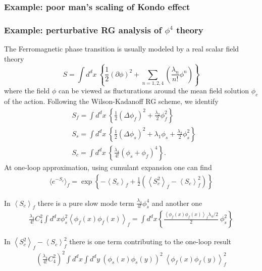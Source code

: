 \documentclass[submission, PhysLectNotes]{SciPost}
\newcommand{\ExOp}[1]{\left\langle#1\right\rangle}
\begin{document}
\subsubsection*{Example: poor man's scaling of Kondo effect}
\subsubsection*{Example: perturbative RG analysis of $\phi^4$ theory}
The Ferromagnetic phase transition is usually modeled by a real scalar field theory
\begin{equation}
S = \int d^d x \ \left\{\frac{1}{2}{\left(\partial\phi\right)}^2 + \sum_{n=1,2,4}\left(\frac{\lambda_n}{n!}\phi^n\right) \right\}
\end{equation}
where the field $\phi$ can be viewed as flucturations around the mean field solution $\phi_c$ of the action. Following the Wilson-Kadanoff RG scheme, we identify
\begin{equation}
\begin{aligned}
&S_f = \int d^d x \ \left\{\frac{1}{2}{\left(\Delta\phi_f\right)}^2 + \frac{\lambda_2}{2}\phi_f^2 \right\} \\
&S_s = \int d^d x \ \left\{\frac{1}{2}{\left(\Delta\phi_s\right)}^2 + \lambda_1 \phi_s + \frac{\lambda_2}{2}\phi_s^2 \right\} \\
&S_c = \int d^d x \ \left\{ \frac{\lambda_4}{4!}{\left(\phi_s + \phi_f\right)}^4 \right\}.
\end{aligned}
\end{equation}
At one-loop approximation, using cumulant expansion one can find
\begin{equation}
\begin{aligned}
\langle e^{-S_c} \rangle_f = \exp\left\{{-\ExOp{S_c}_f + \frac{1}{2}\left( \ExOp{S_c^2}_f - \ExOp{S_c}_f^2\right)}\right\}
\end{aligned}
\end{equation}%

\noindent In $\ExOp{S_c}_f$ there is a pure slow mode term $\frac{\lambda_4}{4!}\phi_s^4$ and another one
\begin{equation}
\begin{aligned}
\frac{\lambda_4}{4!} C^2_4 \int d^d x  \phi_s^2 \ExOp{\phi_f(x)\phi_f(x)}_f = \int d^d x \left\{ \frac{\ExOp{\phi_f(x)\phi_f(x)}_f\lambda_4/2}{2}\ \phi_s^2\right\}
\end{aligned}
\end{equation}

\noindent In $\ExOp{S_c^2}_f - \ExOp{S_c}_f^2$ there is one term contributing to the one-loop result
\begin{equation}
	\begin{aligned}
		{\left( \frac{\lambda_4}{4!} C^2_4 \right)}^2 \int d^d x \int d^d y \ {\left(\phi_s(x){\phi}_s(y)\right)}^2 \ {\ExOp{{\phi}_f(x) {\phi}_f(y)}}_f^2
	\end{aligned}
\end{equation}
\end{document}
